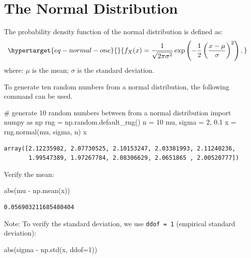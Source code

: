 \documentclass[
  letterpaper,
  DIV=11,
  numbers=noendperiod]{scrreprt}
\newenvironment{Shaded}{\begin{snugshade}}{\end{snugshade}}
\newcommand{\BuiltInTok}[1]{\textcolor[rgb]{0.00,0.23,0.31}{#1}}
\newcommand{\CommentTok}[1]{\textcolor[rgb]{0.37,0.37,0.37}{#1}}
\newcommand{\DecValTok}[1]{\textcolor[rgb]{0.68,0.00,0.00}{#1}}
\newcommand{\FloatTok}[1]{\textcolor[rgb]{0.68,0.00,0.00}{#1}}
\newcommand{\ImportTok}[1]{\textcolor[rgb]{0.00,0.46,0.62}{#1}}
\newcommand{\NormalTok}[1]{\textcolor[rgb]{0.00,0.23,0.31}{#1}}
\newcommand{\OperatorTok}[1]{\textcolor[rgb]{0.37,0.37,0.37}{#1}}
\begin{document}
\hypertarget{the-normal-distribution}{%
\section{The Normal Distribution}\label{the-normal-distribution}}

The probability density function of the normal distribution is defined
as: \begin{equation}\protect\hypertarget{eq-normal-one}{}{
f_X(x) = \frac{1}{\sqrt{2\pi \sigma^2}} \exp\left(-\frac{1}{2} \left(\frac{x-\mu}{\sigma}\right)^2\right),
}\label{eq-normal-one}\end{equation} where: \(\mu\) is the mean;
\(\sigma\) is the standard deviation.

To generate ten random numbers from a normal distribution, the following
command can be used.

\begin{Shaded}
\begin{Highlighting}[]
\CommentTok{\# generate 10 random numbers between from a normal distribution}
\ImportTok{import}\NormalTok{ numpy }\ImportTok{as}\NormalTok{ np}
\NormalTok{rng }\OperatorTok{=}\NormalTok{ np.random.default\_rng()}
\NormalTok{n }\OperatorTok{=} \DecValTok{10}
\NormalTok{mu, sigma }\OperatorTok{=} \DecValTok{2}\NormalTok{, }\FloatTok{0.1}
\NormalTok{x }\OperatorTok{=}\NormalTok{ rng.normal(mu, sigma, n)}
\NormalTok{x}
\end{Highlighting}
\end{Shaded}

\begin{verbatim}
array([2.12235982, 2.07730525, 2.10153247, 2.03381993, 2.11240236,
       1.99547389, 1.97267784, 2.08306629, 2.0651865 , 2.00520777])
\end{verbatim}

Verify the mean:

\begin{Shaded}
\begin{Highlighting}[]
\BuiltInTok{abs}\NormalTok{(mu }\OperatorTok{{-}}\NormalTok{ np.mean(x))}
\end{Highlighting}
\end{Shaded}

\begin{verbatim}
0.056903211685480404
\end{verbatim}

Note: To verify the standard deviation, we use \texttt{ddof\ =\ 1}
(empirical standard deviation):

\begin{Shaded}
\begin{Highlighting}[]
\BuiltInTok{abs}\NormalTok{(sigma }\OperatorTok{{-}}\NormalTok{ np.std(x, ddof}\OperatorTok{=}\DecValTok{1}\NormalTok{))}
\end{Highlighting}
\end{Shaded}
\end{document}
